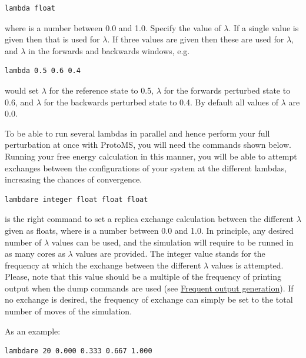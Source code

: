 \documentclass[letterpaper,10pt,english]{sphinxmanual}
\begin{document}
\begin{Verbatim}[frame=single,commandchars=\\\{\}]
lambda float
\end{Verbatim}

where  is a number between 0.0 and 1.0. Specify the value of \(\lambda\). If a single value is given then that is used for \(\lambda\). If three values are given then these are used for \(\lambda\), and \(\lambda\) in the forwards and backwards windows, e.g.

\begin{Verbatim}[frame=single,commandchars=\\\{\}]
lambda 0.5 0.6 0.4
\end{Verbatim}

would set \(\lambda\) for the reference state to 0.5, \(\lambda\) for the forwards perturbed state to 0.6, and \(\lambda\) for the backwards perturbed state to 0.4. By default all values of \(\lambda\) are 0.0.

To be able to run several lambdas in parallel and hence perform your full perturbation at once with ProtoMS, you will need the commands shown below. Running your free energy calculation in this manner, you will be able to attempt exchanges between the configurations of your system at the different lambdas, increasing the chances of convergence.

\begin{Verbatim}[frame=single,commandchars=\\\{\}]
lambdare integer float float float
\end{Verbatim}

is the right command to set a replica exchange calculation between the different \(\lambda\) given as floats, where  is a number between 0.0 and 1.0. In principle, any desired number of \(\lambda\) values can be used, and the simulation will require to be runned in as many cores as \(\lambda\) values are provided. The integer value stands for the frequency at which the exchange between the different \(\lambda\) values is attempted. Please, note that this value should be a multiple of the frequency of printing output when the dump commands are used (see {\hyperref[protoms:frequent-output-generation]{Frequent output generation}}). If no exchange is desired, the frequency of exchange can simply be set to the total number of moves of the simulation.

As an example:

\begin{Verbatim}[frame=single,commandchars=\\\{\}]
lambdare 20 0.000 0.333 0.667 1.000
\end{Verbatim}
\end{document}
